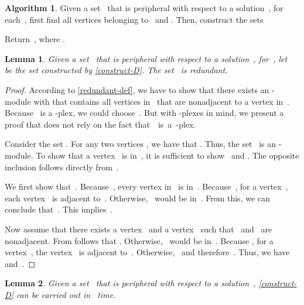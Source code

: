\documentclass[12pt, a4paper, abstracton]{scrreprt}
\newcommand{\md}[1]{\mbox{-module}}
\newcommand{\pl}[1]{\mbox{-plex}}
\newcounter{theorem}
\newtheorem{lemma}{Lemma}[chapter]
\theoremstyle{definition}
\newtheorem{proc}{Algorithm}[chapter]
\theoremstyle{remark}
\begin{document}
\begin{proc}\label{construct-D}
  Given a set~ that is peripheral with respect to a solution~, for each~, first find all vertices belonging to~ and . Then, construct the sets
  
  Return~, where .
\end{proc}

\begin{lemma}\label{construct-D-correct}
  Given a set~ that is peripheral with respect to a solution~, for~, let~ be the set constructed by \autoref{construct-D}. The set~ is redundant.
\end{lemma}
 
\begin{proof}
  According to \autoref{redundant-def}, we have to show that there exists an \md X  with  that contains all vertices in~ that are nonadjacent to a vertex in~. Because~ is a \pl2, we could choose~. But with \pl ses in mind, we present a proof that does not rely on the fact that~~is~a~\pl2.

Consider the set . For any two vertices , we have that . Thus, the set~ is an \md X.  To show that a vertex~ is in~, it is sufficient to show~ and . The opposite inclusion  follows directly from~.

  We first show that~. Because~, every vertex in~ is in~. Because~, for a vertex~, each vertex~ is adjacent to~. Otherwise, ~would be in~. From this, we can conclude that~. This implies~.
 
  Now assume that there exists a vertex ~and a vertex~ such that~ and~ are nonadjacent. From  follows that . Otherwise, ~would be in~. Because , for a vertex~, the vertex ~is adjacent to~. Otherwise, ~and therefore~. Thus, we have  and~.
\end{proof}

\begin{lemma}\label{construct-D-time}
  Given a set~ that is peripheral with respect to a solution~, \autoref{construct-D} can be carried out in ~time.
\end{lemma}
\end{document}
